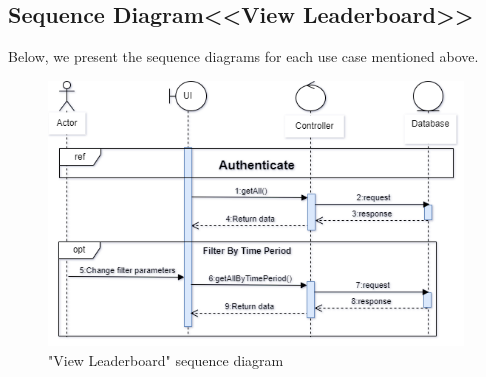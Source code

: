 \subsection{Sequence Diagram<<View Leaderboard>> }
Below, we present the sequence diagrams for each use case mentioned above.

\begin{figure}[H]
   
    
    \includegraphics[width=0.98\textwidth]{images/sprint3/leaderboardSeq.png}
    \caption{"View Leaderboard" sequence diagram}
    \label{fig:enter-label}
    
\end{figure}
